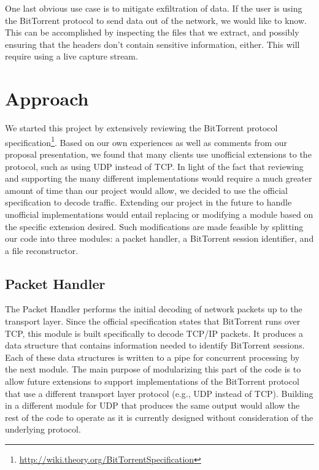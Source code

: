 \documentclass{acm_proc_article-sp}
\begin{document}
One last obvious use case is to mitigate exfiltration of data.  If the user is
using the BitTorrent protocol to send data out of the network, we would like to
know.  This can be accomplished by inspecting the files that we extract, and
possibly ensuring that the headers don't contain sensitive information, either.
This will require using a live capture stream.



\section{Approach}
We started this project by extensively reviewing the BitTorrent protocol
specification\footnote{\url{http://wiki.theory.org/BitTorrentSpecification}}.
Based on our own experiences as well as comments from our proposal presentation,
we found that many clients use unofficial extensions to the protocol, such as
using UDP instead of TCP. In light of the fact that reviewing and supporting
the many different implementations would require a much greater amount of time
than our project would allow, we decided to use the official specification to
decode traffic. Extending our project in the future to handle unofficial
implementations would entail replacing or modifying a module based on the
specific extension desired. Such modifications are made feasible by splitting
our code into three modules: a packet handler, a BitTorrent session identifier,
and a file reconstructor.

\subsection{Packet Handler}
The Packet Handler performs the initial decoding of network packets up to the
transport layer. Since the official specification states that BitTorrent runs
over TCP, this module is built specifically to decode TCP/IP packets. It
produces a data structure that contains information needed to identify
BitTorrent sessions. Each of these data structures is written to a pipe for
concurrent processing by the next module. The main purpose of modularizing this
part of the code is to allow future extensions to support implementations of
the BitTorrent protocol that use a different transport layer protocol
(e.g., UDP instead of TCP). Building in a different module for UDP that
produces the same output would allow the rest of the code to operate as it is
currently designed without consideration of the underlying protocol.
\end{document}
